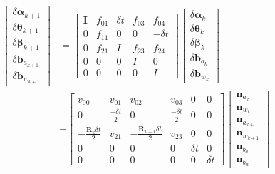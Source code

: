 \begin{equation}
\label{eqn:3.51}
\begin{aligned}
\left[ \begin{array}{c}
{\delta \bm{\alpha}_{k+1}} \\ {\delta \bm{\theta}_{k+1}} \\ {\delta \bm{\beta}_{k+1}} \\ {\delta \mathbf{b}_{a_{k+1}}} \\ {\delta \mathbf{b}_{w_{k+1}}}
\end{array}\right]
&=\left[ \begin{array}{ccccc}
\mathbf{I} & {f_{01}} & {\delta t} & {f_{03}} & {f_{04}} \\ 
{0} & {f_{11}} & {0} & {0} & {-\delta t} \\ 
{0} & {f_{21}} & {I} & {f_{23}} & {f_{24}} \\ 
{0} & {0} & {0} & {I} & {0} \\ 
{0} & {0} & {0} & {0} & {I}
\end{array}\right] 
\left[ \begin{array}{c}
{\delta \bm{\alpha}_{k}} \\ {\delta \bm{\theta}_{k}} \\ {\delta \bm{\beta}_k} \\ {\delta \mathbf{b}_{a_{k}}} \\ {\delta \mathbf{b}_{w_{k}}}
\end{array}\right] \\
&+ \left[ \begin{array}{cccccc}
{v_{00}} & {v_{01}} & {v_{02}} & {v_{03}} & {0} & {0} \\ 
{0} & {\frac{-\delta t}{2}} & {0} & {\frac{-\delta t}{2}} & {0} & {0} \\ 
{-\frac{\mathbf{R}_{k} \delta t}{2}} & {v_{21}} & {-\frac{\mathbf{R}_{k+1} \delta t}{2}} & {v_{23}} & {0} & {0} \\ 
{0} & {0} & {0} & {0} & {\delta t} & {0} \\ 
{0} & {0} & {0} & {0} & {0} & {\delta t}\end{array}\right] 
\left[ \begin{array}
{c}{\mathbf{n}_{a_{k}}} \\ {\mathbf{n}_{w_{k}}} \\ {\mathbf{n}_{a_{k+1}}} \\ {\mathbf{n}_{w_{k+1}}} \\ {\mathbf{n}_{b_{a}}} \\ {\mathbf{n}_{b_{w}}}
\end{array}\right]
\end{aligned}
\end{equation}
